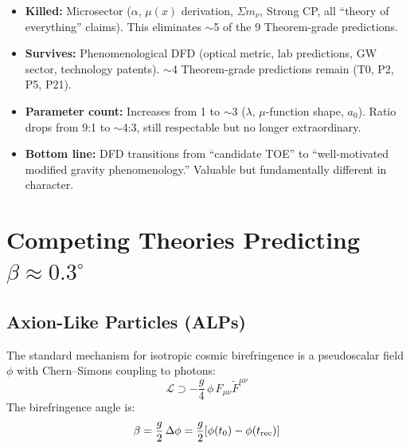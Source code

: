 \documentclass[11pt]{article}
\newcommand{\CS}{Chern--Simons}
\begin{document}
\begin{tcolorbox}[colback=red!5!white, colframe=red!60!black,
  title=\textbf{IF $\beta \neq 0$ CONFIRMED}]
\begin{itemize}
\item \textbf{Killed:} Microsector ($\alpha$, $\mu(x)$ derivation,
  $\Sigma m_\nu$, Strong CP, all ``theory of everything'' claims).
  This eliminates $\sim$5 of the 9 Theorem-grade predictions.

\item \textbf{Survives:} Phenomenological DFD (optical metric,
  lab predictions, GW sector, technology patents).
  $\sim$4 Theorem-grade predictions remain (T0, P2, P5, P21).

\item \textbf{Parameter count:} Increases from 1 to $\sim$3
  ($\lambda$, $\mu$-function shape, $a_0$).  Ratio drops from
  9:1 to $\sim$4:3, still respectable but no longer extraordinary.

\item \textbf{Bottom line:} DFD transitions from ``candidate TOE''
  to ``well-motivated modified gravity phenomenology.''  Valuable
  but fundamentally different in character.
\end{itemize}
\end{tcolorbox}


\section{Competing Theories Predicting $\beta \approx 0.3^\circ$}
\label{sec:competing}

\subsection{Axion-Like Particles (ALPs)}

The standard mechanism for isotropic cosmic birefringence is a
pseudoscalar field $\phi$ with \CS{} coupling to photons:
\begin{equation}
\mathcal{L} \supset -\frac{g}{4}\,\phi\,F_{\mu\nu}\tilde{F}^{\mu\nu}
\end{equation}
The birefringence angle is:
\begin{equation}
\beta = \frac{g}{2}\,\Delta\phi = \frac{g}{2}[\phi(t_0) - \phi(t_{\rm rec})]
\end{equation}
\end{document}
